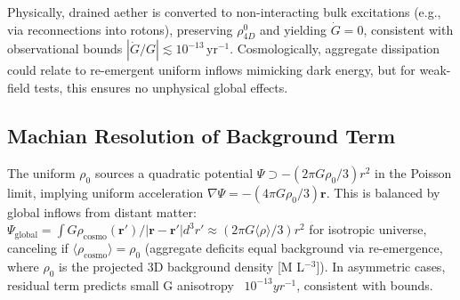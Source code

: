 \documentclass{article}
\begin{document}
Physically, drained aether is converted to non-interacting bulk excitations (e.g., via reconnections into rotons), preserving $\rho_{4D}^0$ and yielding $\dot{G} = 0$, consistent with observational bounds $|\dot{G}/G| \lesssim 10^{-13} \, \mathrm{yr}^{-1}$. Cosmologically, aggregate dissipation could relate to re-emergent uniform inflows mimicking dark energy, but for weak-field tests, this ensures no unphysical global effects.

\subsection{Machian Resolution of Background Term}

The uniform $\rho_0$ sources a quadratic potential $\Psi \supset - (2\pi G \rho_0 / 3) r^2$ in the Poisson limit, implying uniform acceleration $\nabla \Psi = - (4\pi G \rho_0 / 3) \mathbf{r}$. This is balanced by global inflows from distant matter: $\Psi_{\text{global}} = \int G \rho_{\text{cosmo}}(\mathbf{r}') / |\mathbf{r} - \mathbf{r}'| d^3 r' \approx (2\pi G \langle \rho \rangle / 3) r^2$ for isotropic universe, canceling if $\langle \rho_{\text{cosmo}} \rangle = \rho_0$ (aggregate deficits equal background via re-emergence, where $\rho_0$ is the projected 3D background density [M L$^{-3}$]). In asymmetric cases, residual term predicts small G anisotropy ~$10^{-13} yr^{-1}$, consistent with bounds.
\end{document}

